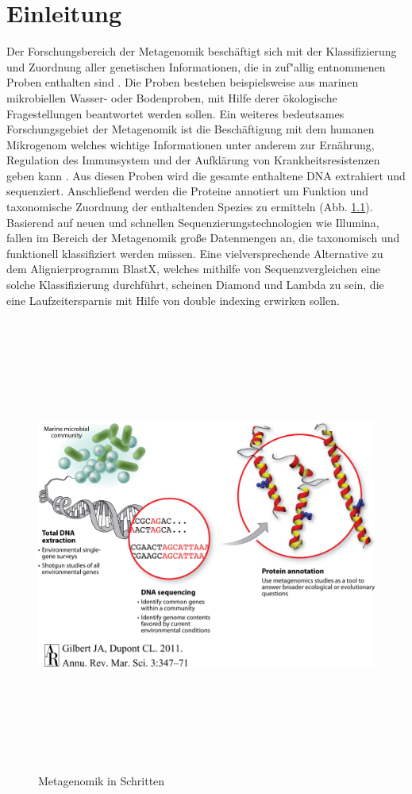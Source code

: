 \documentclass[10pt, a4paper]{report}[08.12.2015]
\begin{document}
   \chapter{Einleitung}
    Der Forschungsbereich der Metagenomik besch\"aftigt sich mit der Klassifizierung und Zuordnung aller genetischen Informationen, die in zuf"allig entnommenen Proben enthalten sind \cite{handelsman1998}. Die Proben bestehen beispielsweise aus marinen mikrobiellen Wasser- oder Bodenproben, mit Hilfe derer \"okologische Fragestellungen beantwortet werden sollen. Ein weiteres bedeutsames Forschungsgebiet der Metagenomik ist die Besch\"aftigung mit dem humanen Mikrogenom welches wichtige Informationen unter anderem zur Ern\"ahrung, Regulation des Immunsystem und der Aufkl\"arung von Krankheitsresistenzen geben kann \cite{dethlefsen2008}. Aus diesen Proben wird die gesamte enthaltene DNA extrahiert und sequenziert. Anschlie{\ss}end werden die Proteine annotiert um Funktion und taxonomische Zuordnung der enthaltenden Spezies zu ermitteln (Abb. \ref{fig:metagenom}).
    Basierend auf neuen und schnellen Sequenzierungstechnologien wie Illumina, fallen im Bereich der Metagenomik gro{\ss}e Datenmengen an, die taxonomisch und funktionell klassifiziert werden m\"ussen. Eine vielversprechende Alternative zu dem Alignierprogramm BlastX, welches mithilfe von Sequenzvergleichen eine solche Klassifizierung durchf\"uhrt, scheinen Diamond \cite{buchfink2014} und Lambda \cite{hauswedell2014} zu sein, die eine Laufzeitersparnis mit Hilfe von double indexing erwirken sollen.
    \newline
    \begin{figure}[H]
\centering
      \noindent\includegraphics[width=\linewidth,height=15cm,
      keepaspectratio]{Abbildungen/metagenome-steps.jpg}
      \caption{Metagenomik in Schritten}
      \label{fig:metagenom}
\end{figure}
   
\end{document}
